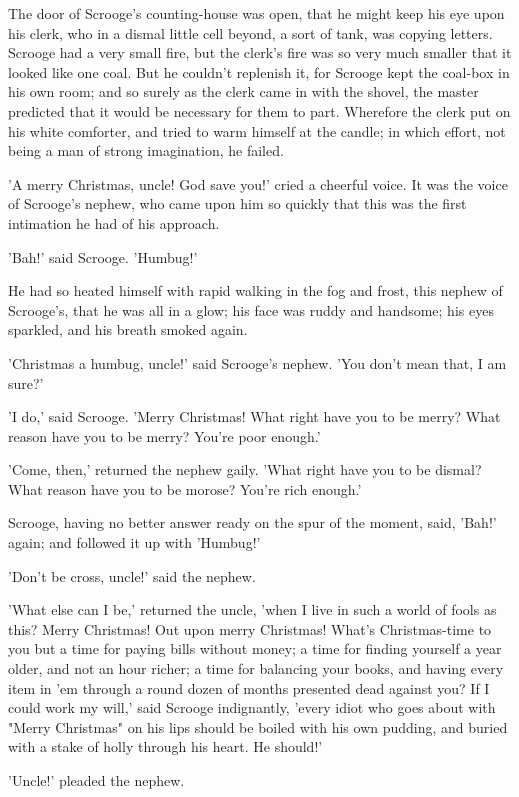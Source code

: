 The door of Scrooge's counting-house was open, that he might keep his
eye upon his clerk, who in a dismal little cell beyond, a sort of tank,
was copying letters. Scrooge had a very small fire, but the clerk's fire
was so very much smaller that it looked like one coal. But he couldn't
replenish it, for Scrooge kept the coal-box in his own room; and so
surely as the clerk came in with the shovel, the master predicted that
it would be necessary for them to part. Wherefore the clerk put on his
white comforter, and tried to warm himself at the candle; in which
effort, not being a man of strong imagination, he failed.

'A merry Christmas, uncle! God save you!' cried a cheerful voice. It was
the voice of Scrooge's nephew, who came upon him so quickly that this
was the first intimation he had of his approach.

'Bah!' said Scrooge. 'Humbug!'

He had so heated himself with rapid walking in the fog and frost, this
nephew of Scrooge's, that he was all in a glow; his face was ruddy and
handsome; his eyes sparkled, and his breath smoked again.

'Christmas a humbug, uncle!' said Scrooge's nephew. 'You don't mean
that, I am sure?'

'I do,' said Scrooge. 'Merry Christmas! What right have you to be merry?
What reason have you to be merry? You're poor enough.'

'Come, then,' returned the nephew gaily. 'What right have you to be
dismal? What reason have you to be morose? You're rich enough.'

Scrooge, having no better answer ready on the spur of the moment, said,
'Bah!' again; and followed it up with 'Humbug!'

'Don't be cross, uncle!' said the nephew.

'What else can I be,' returned the uncle, 'when I live in such a world
of fools as this? Merry Christmas! Out upon merry Christmas! What's
Christmas-time to you but a time for paying bills without money; a time
for finding yourself a year older, and not an hour richer; a time for
balancing your books, and having every item in 'em through a round dozen
of months presented dead against you? If I could work my will,' said
Scrooge indignantly, 'every idiot who goes about with "Merry Christmas"
on his lips should be boiled with his own pudding, and buried with a
stake of holly through his heart. He should!'

'Uncle!' pleaded the nephew.

